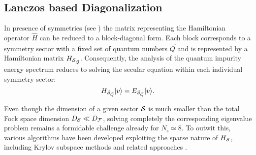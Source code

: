 \documentclass[edipack2.tex]{subfiles}
\begin{document}






\subsection{Lanczos based Diagonalization}\label{sSecHam}
In presence of symmetries (see ) the matrix representing
the Hamiltonian operator $\hat{H}$ can be reduced to a block-diagonal form. Each block corresponds to a symmetry sector
with a fixed set of quantum numbers $\vec{Q}$ and is represented by
a Hamiltonian matrix $H_{{\cal S}_{\vec{Q}}}$. 
Consequently, the analysis of the quantum impurity energy spectrum reduces to solving
the secular equation within each individual symmetry sector:
$$
H_{{\cal S}_{\vec{Q}}}|v\rangle=E_{{\cal S}_{\vec{Q}}}|v\rangle.
$$

Even though the dimension of a given sector ${\cal S}$ is much smaller than the
total Fock space dimension $D_{\cal S} \ll D_{\cal F}$, solving completely the
corresponding eigenvalue problem remains a formidable challenge
already for $N_\mathrm{s}\simeq 8$.
To outwit this, various
algorithms have been developed exploiting the sparse nature of
$H_{\cal S}$, including Krylov subspace methods and related approaches
\cite{Lanczos,Arnoldi,Feast}.
\end{document}
